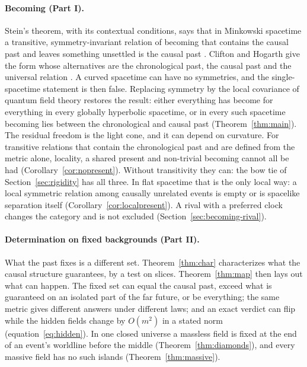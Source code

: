 \documentclass[11pt]{article}
\theoremstyle{definition}
\begin{document}
\paragraph{Becoming (Part I).} Stein's theorem, with its contextual conditions, says that in Minkowski spacetime a transitive, symmetry-invariant relation of becoming that contains the causal past and leaves something unsettled is the causal past \citep{Stein1968,Stein1991}. Clifton and Hogarth give the form whose alternatives are the chronological past, the causal past and the universal relation \citep{CH1995}. A curved spacetime can have no
symmetries, and the single-spacetime statement is then false. Replacing symmetry
by the local covariance of quantum field theory restores the result: either
everything has become for everything in every globally hyperbolic spacetime, or in
every such spacetime becoming lies between the chronological and causal past
(Theorem~\ref{thm:main}). The residual freedom is the light cone, and it can depend
on curvature. For transitive relations that contain the chronological past and are defined from the metric alone, locality, a shared present and non-trivial becoming cannot all be had (Corollary~\ref{cor:nopresent}). Without transitivity they can: the bow tie of Section~\ref{sec:rigidity} has all three. In flat spacetime that is the only local way: a local symmetric relation among causally unrelated events is empty or is spacelike separation itself (Corollary~\ref{cor:localpresent}).
A rival with a preferred clock changes the category and is not excluded
(Section~\ref{sec:becoming-rival}).

\paragraph{Determination on fixed backgrounds (Part II).} What the past fixes is a
different set. Theorem~\ref{thm:char} characterizes what the causal structure
guarantees, by a test on slices. Theorem~\ref{thm:map} then lays out what can
happen. The fixed set can equal the causal past, exceed what is guaranteed on an
isolated part of the far future, or be everything; the same metric gives different
answers under different laws; and an exact verdict can flip while the hidden fields change by $O(m^2)$ in a stated norm (equation~\eqref{eq:hidden}). In one closed universe a massless field is fixed at the end of an
event's worldline before the middle (Theorem~\ref{thm:diamonds}), and every massive
field has no such islands (Theorem~\ref{thm:massive}).
\end{document}
